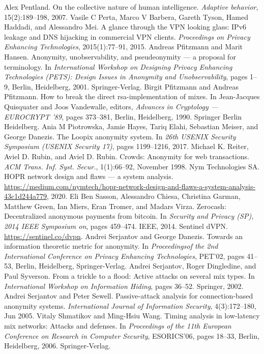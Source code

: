 \documentclass{article}
\begin{document}
\begin{thebibliography}{200}
Alex Pentland. On the collective nature of human intelligence. \emph{Adaptive behavior}, 15(2):189–198, 2007.
Vasile C Perta, Marco V Barbera, Gareth Tyson, Hamed Haddadi, and Alessandro Mei. A glance through the VPN looking glass: IPv6 leakage and DNS hijacking in commercial VPN clients. \emph{Proceedings on Privacy Enhancing Technologies}, 2015(1):77–91, 2015.
Andreas Pfitzmann and Marit Hansen. Anonymity, unobservability, and pseudeonymity — a proposal for terminology. In \emph{International Workshop on Designing Privacy Enhancing Technologies (PETS): Design Issues in Anonymity and Unobservability}, pages 1–9, Berlin, Heidelberg, 2001. Springer-Verlag.
Birgit Pfitzmann and Andreas Pfitzmann. How to break the direct rsa-implementation of mixes. In Jean-Jacques Quisquater and Joos Vandewalle, editors, \emph{Advances in Cryptology — EUROCRYPT ’89}, pages 373–381, Berlin, Heidelberg, 1990. Springer Berlin Heidelberg.
Ania M Piotrowska, Jamie Hayes, Tariq Elahi, Sebastian Meiser, and George Danezis. The Loopix anonymity system. In \emph{26th USENIX Security Symposium (USENIX Security 17)}, pages 1199–1216, 2017.
Michael K. Reiter, Aviel D. Rubin, and Aviel D. Rubin. Crowds: Anonymity for web transactions. \emph{ACM Trans. Inf. Syst. Secur.}, 1(1):66–92, November 1998.
Nym Technologies SA. HOPR network design and flaws — a system analysis. \url{https://medium.com/nymtech/hopr-network-design-and-flaws-a-system-analysis-43c1d244a779}, 2020.
Eli Ben Sasson, Alessandro Chiesa, Christina Garman, Matthew Green, Ian Miers, Eran Tromer, and Madars Virza. Zerocash: Decentralized anonymous payments from bitcoin. In \emph{Security and Privacy (SP), 2014 IEEE Symposium on}, pages 459–474. IEEE, 2014.
Sentinel dVPN. \url{https://sentinel.co/dvpn}.
Andrei Serjantov and George Danezis. Towards an information theoretic metric for anonymity. In \emph{Proceedingsof  the 2nd International Conference on Privacy Enhancing Technologies}, PET’02, pages 41–53, Berlin, Heidelberg, Springer-Verlag.
Andrei Serjantov, Roger Dingledine, and Paul Syverson. From a trickle to a flood: Active attacks on several mix types. In \emph{International Workshop on Information Hiding}, pages 36–52. Springer, 2002.
Andrei Serjantov and Peter Sewell. Passive-attack analysis for connection-based anonymity systems. \emph{International Journal of Information Security}, 4(3):172–180, Jun 2005.
Vitaly Shmatikov and Ming-Hsiu Wang. Timing analysis in low-latency mix networks: Attacks and defenses. In \emph{Proceedings of the 11th European Conference on Research in Computer Security}, ESORICS’06, pages 18–33, Berlin, Heidelberg, 2006. Springer-Verlag.

\end{thebibliography}
\end{document}
